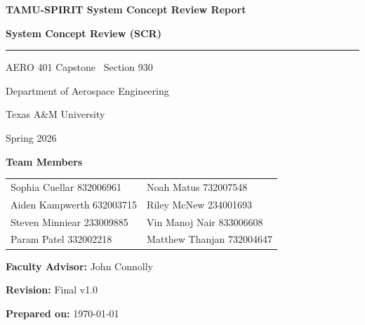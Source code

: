 \documentclass[conf]{new-aiaa}
\begin{document}
\begin{titlepage}
    \centering
    \vspace*{1.5cm}

    {\LARGE \textbf{TAMU-SPIRIT System Concept Review Report}\par}
    \vspace{0.2cm}
    {\large \textbf{System Concept Review (SCR)}\par}

    \vspace{0.6cm}
    \rule{0.8\textwidth}{0.4pt}\par
    \vspace{0.6cm}

    {\large AERO 401 Capstone \textbar\ Section 930\par}
    {\large Department of Aerospace Engineering\par}
    {\large Texas A\&M University\par}
    {\large Spring 2026\par}

    \vspace{0.8cm}
    {\large \textbf{Team Members}\par}
    \vspace{0.3cm}
    \begin{tabular}{@{}p{}p{}@{}}
    Sophia Cuellar \hfill 832006961 & Noah Matus \hfill 732007548 \\
    Aiden Kampwerth \hfill 632003715 & Riley McNew \hfill 234001693 \\
    Steven Minniear \hfill 233009885 & Vin Manoj Nair \hfill 833006608 \\
    Param Patel \hfill 332002218 & Matthew Thanjan \hfill 732004647 \\
    \end{tabular}

    \vspace{0.8cm}
    {\large \textbf{Faculty Advisor:} John Connolly\par}
    {\large \textbf{Revision:} Final v1.0\par}
    {\large \textbf{Prepared on:} \today\par}

    \vspace*{\fill}
\end{titlepage}

\tableofcontents
\clearpage
\listoffigures
\clearpage
\listoftables
\clearpage
\end{document}
